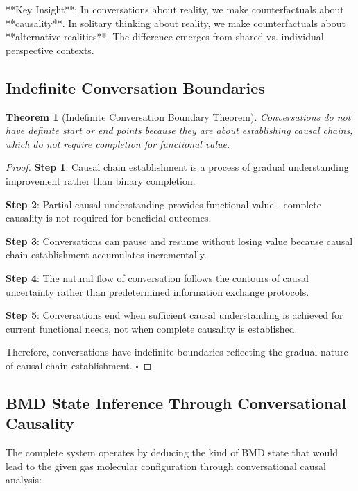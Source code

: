 \documentclass[11pt,a4paper]{article}
\newtheorem{theorem}{Theorem}[section]
\begin{document}
**Key Insight**: In conversations about reality, we make counterfactuals about **causality**. In solitary thinking about reality, we make counterfactuals about **alternative realities**. The difference emerges from shared vs. individual perspective contexts.

\subsection{Indefinite Conversation Boundaries}

\begin{theorem}[Indefinite Conversation Boundary Theorem]
Conversations do not have definite start or end points because they are about establishing causal chains, which do not require completion for functional value.
\end{theorem}

\begin{proof}
\textbf{Step 1}: Causal chain establishment is a process of gradual understanding improvement rather than binary completion.

\textbf{Step 2}: Partial causal understanding provides functional value - complete causality is not required for beneficial outcomes.

\textbf{Step 3}: Conversations can pause and resume without losing value because causal chain establishment accumulates incrementally.

\textbf{Step 4}: The natural flow of conversation follows the contours of causal uncertainty rather than predetermined information exchange protocols.

\textbf{Step 5}: Conversations end when sufficient causal understanding is achieved for current functional needs, not when complete causality is established.

Therefore, conversations have indefinite boundaries reflecting the gradual nature of causal chain establishment. $\square$
\end{proof}

\subsection{BMD State Inference Through Conversational Causality}

The complete system operates by deducing the kind of BMD state that would lead to the given gas molecular configuration through conversational causal analysis:
\end{document}
